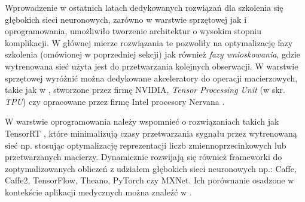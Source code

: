 Wprowadzenie w ostatnich latach dedykowanych rozwiązań dla szkolenia się głębokich sieci neuronowych, zarówno w warstwie sprzętowej jak i oprogramowania, umożliwiło tworzenie architektur o wysokim stopniu komplikacji. W głównej mierze rozwiązania te pozwoliły na optymalizację fazy szkolenia (omówionej w poprzedniej sekcji) jak również \textit{fazy wnioskowania}, gdzie wytrenowana sieć użyta jest \linebreak do przetwarzania kolejnych obserwacji. W warstwie sprzętowej wyróżnić można dedykowane akceleratory do operacji macierzowych, takie jak w \cite{DBLP:journals/corr/abs-1803-04014}, stworzone przez firmę NVIDIA, \textit{Tensor Processing Unit} (w skr. \textit{TPU}) czy opracowane przez firmę Intel procesory Nervana \cite{Intel}. 

W warstwie oprogramowania należy wspomnieć o rozwiązaniach takich jak TensorRT \cite{TensorRT}, które minimalizują czasy przetwarzania sygnału przez wytrenowaną sieć np. stosując optymalizację reprezentacji liczb zmiennoprzecinkowych lub przetwarzanych macierzy. Dynamicznie rozwijają się również frameworki do zoptymalizowanych obliczeń z udziałem głębokich sieci neuronowych np.: Caffe, Caffe2, TensorFlow, Theano, PyTorch czy MXNet. Ich porównanie osadzone w kontekście aplikacji medycznych można znaleźć w \cite{Erickson2017}.

